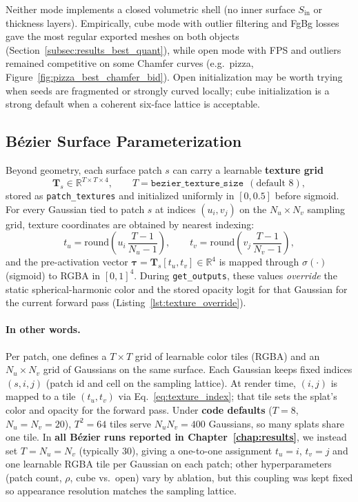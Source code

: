 \documentclass{report}
\begin{document}
Neither mode implements a closed volumetric shell (no inner surface $S_{\mathrm{in}}$ or thickness layers). Empirically, cube mode with outlier filtering and FgBg losses gave the most regular exported meshes on both objects (Section~\ref{subsec:results_best_quant}), while open mode with FPS and outliers remained competitive on some Chamfer curves (e.g.\ pizza, Figure~\ref{fig:pizza_best_chamfer_bid}). Open initialization may be worth trying when seeds are fragmented or strongly curved locally; cube initialization is a strong default when a coherent six-face lattice is acceptable.

\subsection{B\'ezier Surface Parameterization}
\label{subsec:bezier_textures}

Beyond geometry, each surface patch $s$ can carry a learnable \textbf{texture grid}
\[
\mathbf{T}_s \in \mathbb{R}^{T\times T\times 4},
\qquad T=\texttt{bezier\_texture\_size}\ \ (\text{default }8),
\]
stored as \texttt{patch\_textures} and initialized uniformly in $[0,0.5]$ before sigmoid. For every Gaussian tied to patch $s$ at indices $(u_i,v_j)$ on the $N_u\times N_v$ sampling grid, texture coordinates are obtained by nearest indexing:
\begin{equation}
t_u = \mathrm{round}\!\left(u_i\,\frac{T-1}{N_u-1}\right),\qquad
t_v = \mathrm{round}\!\left(v_j\,\frac{T-1}{N_v-1}\right),
\label{eq:texture_index}
\end{equation}
and the pre-activation vector $\boldsymbol{\tau}=\mathbf{T}_s[t_u,t_v]\in\mathbb{R}^4$ is mapped through $\sigma(\cdot)$ (sigmoid) to RGBA in $[0,1]^4$. During \texttt{get\_outputs}, these values \emph{override} the static spherical-harmonic color and the stored opacity logit for that Gaussian for the current forward pass (Listing~\ref{lst:texture_override}).

\paragraph{In other words.}
Per patch, one defines a $T\times T$ grid of learnable color tiles (RGBA) and an $N_u\times N_v$ grid of Gaussians on the same surface. Each Gaussian keeps fixed indices $(s,i,j)$ (patch id and cell on the sampling lattice). At render time, $(i,j)$ is mapped to a tile $(t_u,t_v)$ via Eq.~\eqref{eq:texture_index}; that tile sets the splat's color and opacity for the forward pass. Under \textbf{code defaults} ($T{=}8$, $N_u{=}N_v{=}20$), $T^2{=}64$ tiles serve $N_u N_v{=}400$ Gaussians, so many splats share one tile. In \textbf{all B\'ezier runs reported in Chapter~\ref{chap:results}}, we instead set $T=N_u=N_v$ (typically $30$), giving a one-to-one assignment $t_u{=}i$, $t_v{=}j$ and one learnable RGBA tile per Gaussian on each patch; other hyperparameters (patch count, $\rho$, cube vs.\ open) vary by ablation, but this coupling was kept fixed so appearance resolution matches the sampling lattice.
\end{document}
